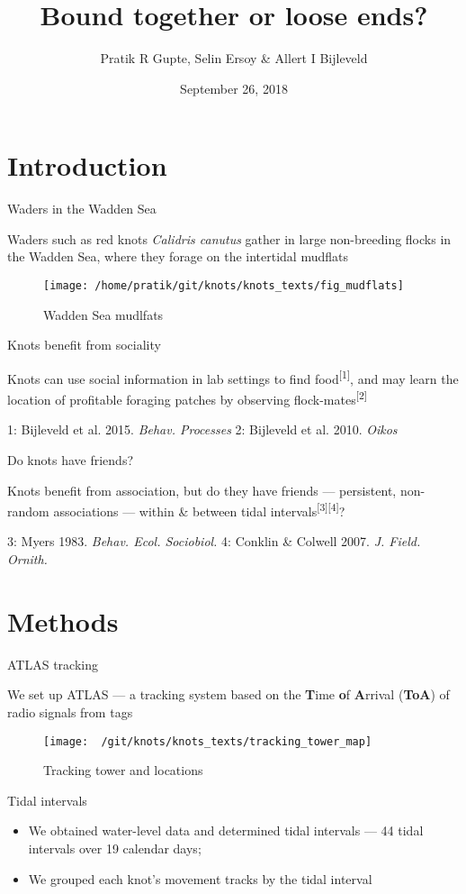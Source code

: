 \documentclass[ignorenonframetext,]{beamer}
\title{Bound together or loose ends?}
\author{Pratik R Gupte, Selin Ersoy \& Allert I Bijleveld}
\date{September 26, 2018}
\providecommand{\tightlist}{%
  \setlength{\itemsep}{0pt}\setlength{\parskip}{0pt}}
\begin{document}
\frame{\titlepage}

\section{Introduction}\label{introduction}

\begin{frame}{Waders in the Wadden Sea}

Waders such as red knots \emph{Calidris canutus} gather in large
non-breeding flocks in the Wadden Sea, where they forage on the
intertidal mudflats

\begin{figure}
\texttt{[image: /home/pratik/git/knots/knots\_texts/fig\_mudflats]} \caption{Wadden Sea mudlfats}\label{fig:unnamed-chunk-1}
\end{figure}

\end{frame}

\begin{frame}{Knots benefit from sociality}

Knots can use social information in lab settings to find
food\textsuperscript{{[}1{]}}, and may learn the location of profitable
foraging patches by observing flock-mates\textsuperscript{{[}2{]}}

 1: Bijleveld et al. 2015. \emph{Behav. Processes} 2: Bijleveld et al.
2010. \emph{Oikos}

\end{frame}

\begin{frame}{Do knots have friends?}

Knots benefit from association, but do they have friends --- persistent,
non-random associations --- within \& between tidal
intervals\textsuperscript{{[}3{]}{[}4{]}}?

 3: Myers 1983. \emph{Behav. Ecol. Sociobiol.} 4: Conklin \& Colwell
2007. \emph{J. Field. Ornith.}

\end{frame}

\section{Methods}\label{methods}

\begin{frame}{ATLAS tracking}

We set up ATLAS --- a tracking system based on the \textbf{T}ime
\textbf{o}f \textbf{A}rrival (\textbf{ToA}) of radio signals from tags

\begin{figure}
\texttt{[image: ~/git/knots/knots\_texts/tracking\_tower\_map]} \caption{Tracking tower and locations}\label{fig:unnamed-chunk-2}
\end{figure}

\end{frame}

\begin{frame}{Tidal intervals}

\begin{itemize}
\tightlist
\item
  We obtained water-level data and determined tidal intervals --- 44
  tidal intervals over 19 calendar days;
\item
  We grouped each knot's movement tracks by the tidal interval
\end{itemize}

\end{frame}
\end{document}
